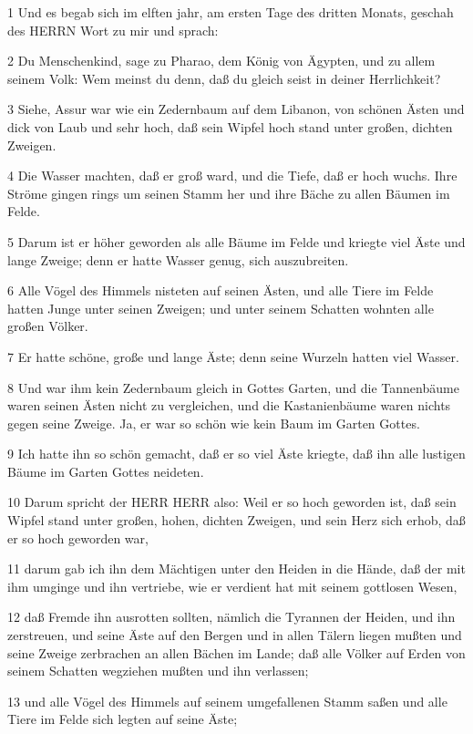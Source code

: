 \par 1 Und es begab sich im elften jahr, am ersten Tage des dritten Monats, geschah des HERRN Wort zu mir und sprach:
\par 2 Du Menschenkind, sage zu Pharao, dem König von Ägypten, und zu allem seinem Volk: Wem meinst du denn, daß du gleich seist in deiner Herrlichkeit?
\par 3 Siehe, Assur war wie ein Zedernbaum auf dem Libanon, von schönen Ästen und dick von Laub und sehr hoch, daß sein Wipfel hoch stand unter großen, dichten Zweigen.
\par 4 Die Wasser machten, daß er groß ward, und die Tiefe, daß er hoch wuchs. Ihre Ströme gingen rings um seinen Stamm her und ihre Bäche zu allen Bäumen im Felde.
\par 5 Darum ist er höher geworden als alle Bäume im Felde und kriegte viel Äste und lange Zweige; denn er hatte Wasser genug, sich auszubreiten.
\par 6 Alle Vögel des Himmels nisteten auf seinen Ästen, und alle Tiere im Felde hatten Junge unter seinen Zweigen; und unter seinem Schatten wohnten alle großen Völker.
\par 7 Er hatte schöne, große und lange Äste; denn seine Wurzeln hatten viel Wasser.
\par 8 Und war ihm kein Zedernbaum gleich in Gottes Garten, und die Tannenbäume waren seinen Ästen nicht zu vergleichen, und die Kastanienbäume waren nichts gegen seine Zweige. Ja, er war so schön wie kein Baum im Garten Gottes.
\par 9 Ich hatte ihn so schön gemacht, daß er so viel Äste kriegte, daß ihn alle lustigen Bäume im Garten Gottes neideten.
\par 10 Darum spricht der HERR HERR also: Weil er so hoch geworden ist, daß sein Wipfel stand unter großen, hohen, dichten Zweigen, und sein Herz sich erhob, daß er so hoch geworden war,
\par 11 darum gab ich ihn dem Mächtigen unter den Heiden in die Hände, daß der mit ihm umginge und ihn vertriebe, wie er verdient hat mit seinem gottlosen Wesen,
\par 12 daß Fremde ihn ausrotten sollten, nämlich die Tyrannen der Heiden, und ihn zerstreuen, und seine Äste auf den Bergen und in allen Tälern liegen mußten und seine Zweige zerbrachen an allen Bächen im Lande; daß alle Völker auf Erden von seinem Schatten wegziehen mußten und ihn verlassen;
\par 13 und alle Vögel des Himmels auf seinem umgefallenen Stamm saßen und alle Tiere im Felde sich legten auf seine Äste;
